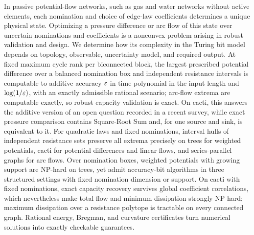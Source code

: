 In passive potential-flow networks, such as gas and water networks
without active elements, each nomination and choice of edge-law
coefficients determines a unique physical state. Optimizing a pressure
difference or arc flow of this state over uncertain nominations and
coefficients is a nonconvex problem arising in robust validation and
design. We determine how its complexity in the Turing bit model depends
on topology, observable, uncertainty model, and required output. At
fixed maximum cycle rank per biconnected block, the largest prescribed
potential difference over a balanced nomination box and independent
resistance intervals is computable to additive accuracy $\varepsilon$ in time
polynomial in the input length and $\log(1/\varepsilon)$, with an exactly
admissible rational scenario; arc-flow extrema are computable exactly,
so robust capacity validation is exact. On cacti, this answers the
additive version of an open question recorded in a recent survey, while exact
pressure comparison contains Square-Root Sum and, for one source and
sink, is equivalent to it. For quadratic laws and fixed nominations,
interval hulls of independent resistance sets preserve all extrema
precisely on trees for weighted potentials, cacti for potential
differences and linear flows, and series-parallel graphs for arc flows.
Over nomination boxes, weighted
potentials with growing support are NP-hard on trees, yet admit
accuracy-bit algorithms in three structured settings with fixed
nomination dimension or support. On cacti with fixed nominations, exact
capacity recovery survives global coefficient correlations, which
nevertheless make total flow and minimum dissipation strongly NP-hard;
maximum dissipation over a resistance polytope is tractable on every
connected graph. Rational energy, Bregman, and curvature certificates
turn numerical solutions into exactly checkable guarantees.
